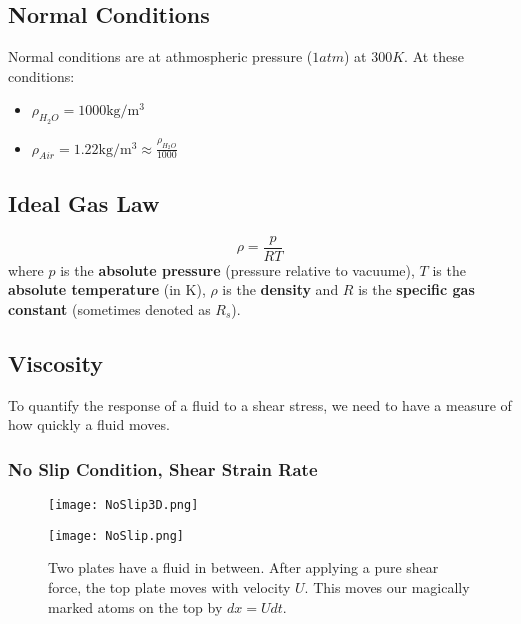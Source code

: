 \subsection{Normal Conditions}
Normal conditions are at athmospheric pressure ($1atm$) at $300K$. At these conditions:
\begin{itemize}
    \item $\rho_{H_2O} = 1000 \mathrm{kg/m^3}$
    \item $\rho_{Air} = 1.22 \mathrm{kg/m^3} \approx \frac{\rho_{H_2O}}{1000}$
\end{itemize}

\subsection{Ideal Gas Law}
$$
\rho = \frac{p}{RT}
$$
where $p$ is the \textbf{absolute pressure} (pressure relative to vacuume), $T$ is the \textbf{absolute temperature} (in $\mathrm{K}$), $\rho$ is the \textbf{density} and $R$ is the \textbf{specific gas constant} (sometimes denoted as $R_s$).

\subsection{Viscosity}
To quantify the response of a fluid to a shear stress, we need to have a measure of how quickly a fluid moves.

\subsubsection{No Slip Condition, Shear Strain Rate}
\begin{center}
\end{center}

\begin{figure}[H]
	\begin{minipage}{0.45\textwidth}   
		\centering
		\texttt{[image: NoSlip3D.png]}
	\end{minipage}
	\hfill
	\begin{minipage}{0.45\textwidth}
		\centering
		\texttt{[image: NoSlip.png]}
	\end{minipage}
	\caption{Two plates have a fluid in between. After applying a pure shear force, the top plate moves with velocity $U$. This moves our magically marked atoms on the top by $dx=Udt$.}
\end{figure}

